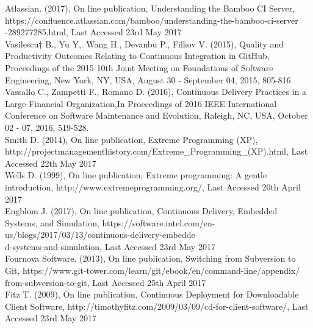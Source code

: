 \begin{thebibliography}{0}

Atlassian. (2017), On line publication, Understanding the Bamboo CI Server, https://confluence.atlassian.com/bamboo/understanding-the-bamboo-ci-server\\-289277285.html, Last Accessed 23rd May 2017
\\
Vasilescu† B., Yu Y,. Wang H., Devanbu P., Filkov V. (2015), Quality and Productivity Outcomes Relating to Continuous Integration in GitHub, Proceedings of the 2015 10th Joint Meeting on Foundations of Software Engineering, New York, NY, USA, August 30 - September 04, 2015, 805-816
\\
Vassallo C., Zampetti F., Romano D. (2016), Continuous Delivery Practices in a Large Financial Organization,In Proceedings of 2016 IEEE International Conference on Software Maintenance and Evolution, Raleigh, NC, USA, October 02 - 07, 2016, 519-528.
\\
Smith D. (2014), On line publication, Extreme Programming (XP), http://projectmanagementhistory.com/Extreme\_Programming\_(XP).html, Last Accessed 22th May 2017
\\
Wells D. (1999), On line publication, Extreme programming: A gentle introduction, http://www.extremeprogramming.org/, Last Accessed 20th April 2017
\\
Engblom J. (2017), On line publication, Continuous Delivery, Embedded Systems, and Simulation, https://software.intel.com/en-us/blogs/2017/03/13/continuous-delivery-embedde\\d-systems-and-simulation, Last Accessed 23rd May 2017
\\
Fournova Software. (2013), On line publication, Switching from Subversion to Git, https://www.git-tower.com/learn/git/ebook/en/command-line/appendix/\\from-subversion-to-git, Last Accessed 25th April 2017
\\
Fitz T. (2009), On line publication, Continuous Deployment for Downloadable Client Software, http://timothyfitz.com/2009/03/09/cd-for-client-software/, Last Accessed 23rd May 2017
\\

\end{thebibliography}
